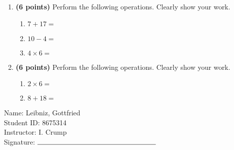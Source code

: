 \documentclass[12pt]{amsart}
\begin{document}
\newpage
\begin{enumerate}
\item {\bf (6 points)} 
 Perform the following operations. Clearly show your work. \begin{enumerate}


\def \a{7}\def \b{17}\def \apb{24}

 
\item $\a + \b = $

\vspace{2cm}
\def \a{10}\def \dif{6}\def \b{4}

 
\item $\a - \b = $

\vspace{2cm}
\def \a{4}\def \b{6}\def \ab{10}

 
\item $\a \times \b = $ 

\vspace{2cm}
\def \vshift{3}\def \hshift{2}\def \chang{-1}\def \findval{1}\def \yval{5}

 
\end{enumerate}


\newpage
\item {\bf (6 points)} 
 Perform the following operations. Clearly show your work. \begin{enumerate}


\def \a{2}\def \b{6}\def \ab{8}

 
\item $\a \times \b = $ 

\vspace{2cm}
\def \a{8}\def \b{18}\def \apb{26}

 
\item $\a + \b = $

\vspace{2cm}
\def \vshift{-5}\def \hshift{2}\def \chang{0}\def \findval{2}\def \yval{-5}

 
\end{enumerate}


\newpage\end{enumerate}\graphicspath{{/Users/jilan/Downloads/Randomizer/Randomizer/Sample Course/Sample Assessment 2/}}\setcounter{page}{1}


\thispagestyle{fancy}

 \noindent Name: Leibniz, Gottfried \vspace{.3cm} \\\noindent Student ID: 8675314 \vspace{.3cm} \\\noindent Instructor: I. Crump \vspace{.3cm} \\\noindent Signature: $\rule{6cm}{0.15mm}$ \vspace{.3cm} \\ 
\end{document}
